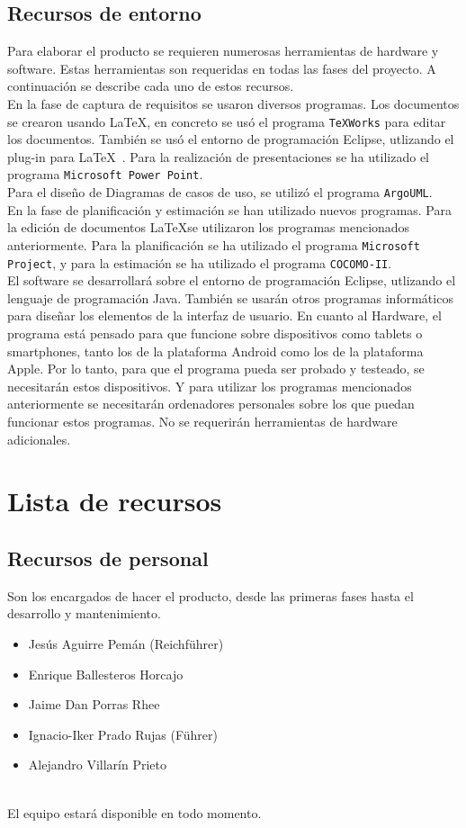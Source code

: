 \documentclass[spanish,a4paper,12pt]{report}	%
\begin{document}
		\subsection{Recursos de entorno}
			Para elaborar el producto se requieren numerosas herramientas de hardware y
			software. Estas herramientas son requeridas en todas las fases del proyecto. 
			A continuación se describe cada uno de estos recursos.  \\
			En la fase de captura de requisitos se usaron diversos programas. Los documentos
			se crearon usando \LaTeX , en concreto se usó el programa \texttt{TeXWorks} para editar los documentos.
			También se usó el entorno de programación Eclipse, utlizando el plug-in para \LaTeX\  . 
			Para la realización de presentaciones se ha utilizado el programa \texttt{Microsoft Power Point}.\\
			Para el diseño de Diagramas de casos de uso, se utilizó el programa \texttt{ArgoUML}.\\
			En la fase de planificación y estimación se han utilizado nuevos programas. Para la edición de documentos
			\LaTeX se utilizaron los programas mencionados anteriormente. Para la planificación se ha utilizado el programa
			\texttt{Microsoft Project}, y para la estimación se ha utilizado el programa \texttt{COCOMO-II}.\\ 
			El software se desarrollará sobre el entorno de
			programación Eclipse, utlizando el lenguaje de programación Java. También se
			usarán otros programas informáticos para diseñar los elementos de la interfaz de
			usuario. En cuanto al Hardware, el programa está pensado para que funcione sobre dispositivos como
			tablets o smartphones, tanto los de la plataforma Android como los de la
			plataforma Apple. Por lo tanto, para que el programa pueda ser probado y
			testeado, se necesitarán estos dispositivos. Y para utilizar los programas mencionados anteriormente
			se necesitarán ordenadores personales sobre los que puedan funcionar estos programas.
			No se requerirán herramientas de
			hardware adicionales.


	\section{Lista de recursos}
		\subsection*{Recursos de personal}
			Son los encargados de hacer el producto, desde las primeras fases hasta el desarrollo y mantenimiento.\\
			\begin{itemize}
			  \item Jesús Aguirre Pemán (Reichführer)
			  \item Enrique Ballesteros Horcajo
			  \item Jaime Dan Porras Rhee
			  \item Ignacio-Iker Prado Rujas (Führer)
			  \item Alejandro Villarín Prieto
			\end{itemize}\\
			El equipo estará disponible en todo momento.
\end{document}
